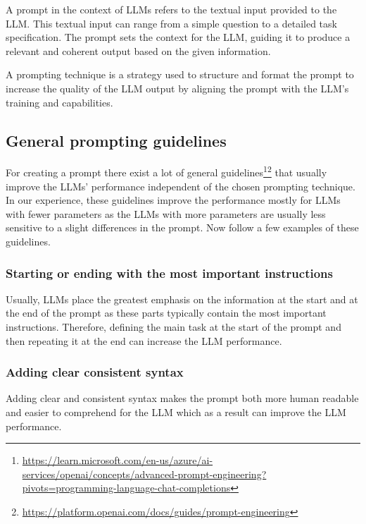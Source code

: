 A prompt in the context of LLMs refers to the textual input provided to the LLM. This textual input can range from a simple question to a detailed task specification. The prompt sets the context for the LLM, guiding it to produce a relevant and coherent output based on the given information.

A prompting technique is a strategy used to structure and format the prompt to increase the quality of the LLM output by aligning the prompt with the LLM's training and capabilities.


\subsection{General prompting guidelines}
\label{prompt_general_tips}

For creating a prompt there exist a lot of general guidelines\footnote{\url{https://learn.microsoft.com/en-us/azure/ai-services/openai/concepts/advanced-prompt-engineering?pivots=programming-language-chat-completions}}\footnote{\url{https://platform.openai.com/docs/guides/prompt-engineering}} that usually improve the LLMs' performance independent of the chosen prompting technique. In our experience, these guidelines improve the performance mostly for LLMs with fewer parameters as the LLMs with more parameters are usually less sensitive to a slight differences in the prompt. Now follow a few examples of these guidelines.


\subsubsection{Starting or ending with the most important instructions}

Usually, LLMs place the greatest emphasis on the information at the start and at the end of the prompt as these parts typically contain the most important instructions. Therefore, defining the main task at the start of the prompt and then repeating it at the end can increase the LLM performance.


\subsubsection{Adding clear consistent syntax}

Adding clear and consistent syntax makes the prompt both more human readable and easier to comprehend for the LLM which as a result can improve the LLM performance.



